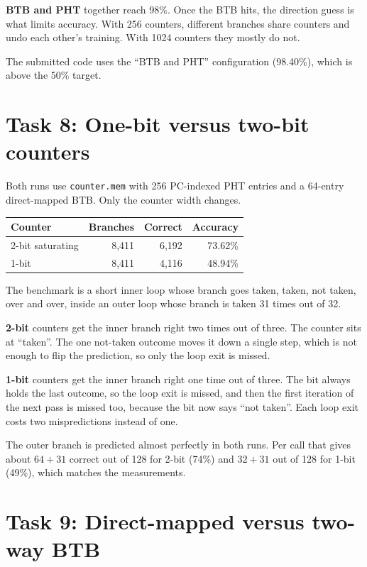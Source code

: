 \documentclass[10pt]{article}
\begin{document}
\textbf{BTB and PHT} together reach 98\%. Once the BTB hits, the direction
guess is what limits accuracy. With 256 counters, different branches share
counters and undo each other's training. With 1024 counters they mostly do
not.

The submitted code uses the ``BTB and PHT'' configuration (98.40\%), which is
above the 50\% target.

\section*{Task 8: One-bit versus two-bit counters}

Both runs use \texttt{counter.mem} with 256 PC-indexed PHT entries and a
64-entry direct-mapped BTB. Only the counter width changes.

\begin{center}
\begin{tabular}{lrrr}
\toprule
Counter & Branches & Correct & Accuracy \\
\midrule
2-bit saturating & 8{,}411 & 6{,}192 & 73.62\% \\
1-bit            & 8{,}411 & 4{,}116 & 48.94\% \\
\bottomrule
\end{tabular}
\end{center}

The benchmark is a short inner loop whose branch goes taken, taken, not
taken, over and over, inside an outer loop whose branch is taken 31 times out
of 32.

\textbf{2-bit} counters get the inner branch right two times out of three.
The counter sits at ``taken''. The one not-taken outcome moves it down a
single step, which is not enough to flip the prediction, so only the loop
exit is missed.

\textbf{1-bit} counters get the inner branch right one time out of three. The
bit always holds the last outcome, so the loop exit is missed, and then the
first iteration of the next pass is missed too, because the bit now says
``not taken''. Each loop exit costs two mispredictions instead of one.

The outer branch is predicted almost perfectly in both runs. Per call that
gives about $64 + 31$ correct out of 128 for 2-bit (74\%) and $32 + 31$ out
of 128 for 1-bit (49\%), which matches the measurements.

\section*{Task 9: Direct-mapped versus two-way BTB}
\end{document}
